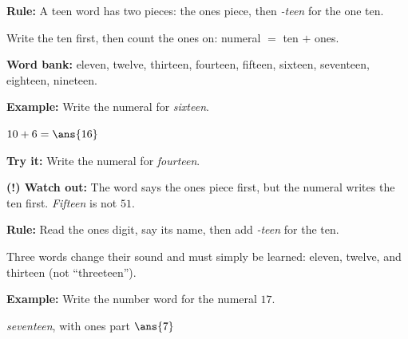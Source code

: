 \documentclass[12pt]{article}
\begin{document}


\begin{formulabox}
\textbf{Rule:} A teen word has two pieces: the ones piece, then \emph{-teen} for the one ten.\par
Write the ten first, then count the ones on: \quad numeral $=$ ten $+$ ones.\par
\textbf{Word bank:} eleven, twelve, thirteen, fourteen, fifteen, sixteen, seventeen, eighteen, nineteen.
\end{formulabox}

\begin{examplebox}
\textbf{Example:} \quad Write the numeral for \emph{sixteen}.

$10 + 6 = \ans{16}$
\end{examplebox}

\begin{tryitbox}
\textbf{Try it:} \quad Write the numeral for \emph{fourteen}.\\[2pt]
\end{tryitbox}

\begin{watchoutbox}
\textbf{(!) Watch out:} The word says the ones piece first, but the numeral writes the ten first. \emph{Fifteen} is not $51$.
\end{watchoutbox}


\begin{formulabox}
\textbf{Rule:} Read the ones digit, say its name, then add \emph{-teen} for the ten.\par
Three words change their sound and must simply be learned: eleven, twelve, and thirteen (not ``threeteen'').
\end{formulabox}

\begin{examplebox}
\textbf{Example:} \quad Write the number word for the numeral $17$.

\emph{seventeen}, with ones part $\ans{7}$
\end{examplebox}
\end{document}
